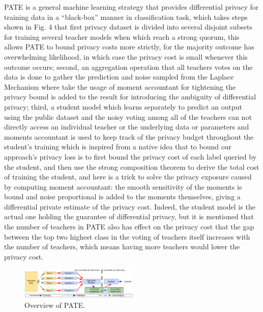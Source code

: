 \documentclass[conference]{IEEEtran}
\begin{document}
PATE\cite{b23} is a general machine learning strategy that provides differential privacy for training data in a “black-box” manner in classification task, which takes steps shown in Fig. 4 that first privacy dataset is divided into several disjoint subsets for training several teacher models when which reach a strong quorum, this allows PATE to bound privacy costs more strictly, for the majority outcome has overwhelming likelihood, in which case the privacy cost is small whenever this outcome occurs; second, an aggregation operation that all teachers votes on the data is done to gather the prediction and noise sampled from the Laplace Mechanism where take the usage of moment accountant for tightening the privacy bound is added to the result for introducing the ambiguity of differential privacy; third, a student model which learns separately to predict an output using the public dataset and the noisy voting among all of the teachers can not directly access an individual teacher or the underlying data or parameters and moments accountant is used to keep track of the privacy budget throughout the student’s training which is inspired from a native idea that to bound our approach’s privacy loss is to first bound the privacy cost of each label queried by the student, and then use the strong composition theorem to derive the total cost of training the student, and here is a trick to solve the privacy exposure caused by computing moment accountant: the smooth sensitivity of the moments is bound and noise proportional is added to the moments themselves, giving a differential private estimate of the privacy cost. Indeed, the student model is the actual one holding the guarantee of differential privacy, but it is mentioned that the number of teachers in PATE also has effect on the privacy cost that the gap between the top two highest class in the voting of teachers itself increases with the number of teachers, which means having more teachers would lower the privacy cost. 
\begin{figure}[htbp]
    \centerline{\includegraphics[width=0.5\textwidth,height=0.15\textwidth]{PATE.png}}
    \caption{Overview of PATE.}
    \label{fig4}
\end{figure}\\
\end{document}
